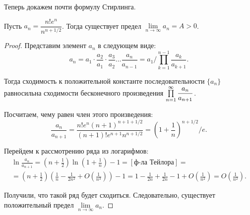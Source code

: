 Теперь докажем почти формулу Стирлинга.
\begin{Statement}
Пусть $a_n = \dfrac{n!e^n}{n^{n + 1/2}}$. Тогда существует предел $\lim\limits_{n \to \infty}a_n = A > 0$.
\end{Statement}
\begin{proof}
Представим элемент $a_n$ в следующем виде:
$$
a_n = a_1 \cdot \frac{a_2}{a_1}\cdot\frac{a_3}{a_2} \ldots \frac{a_n}{a_{n-1}} = a_1 / \prod\limits_{k=1}^{n-1} \frac{a_k}{a_{k+1}}.
$$

Тогда сходимость к положительной константе последовательности $\{a_n\}$ равносильна сходимости бесконечного произведения $\prod\limits_{n=1}^{\infty} \dfrac{a_n}{a_{n+1}}$.

Посчитаем, чему равен член этого произведения:
$$
\frac{a_n}{a_{n+1}} = \frac{n!e^n (n+1)^{n+1+1/2}}{(n+1)! e^{n+1}n^{n+1/2} } = \left(1 + \frac{1}{n} \right)^{n + 1/2} / e.
$$

Перейдем к рассмотрению ряда из логарифмов:
\begin{gather*}
\ln \frac{a_n}{a_{n+1}} = \left( n + \frac{1}{2}\right)\ln\left( 1 + \frac{1}{n}\right) - 1 = [\text{ф-ла Тейлора}] = \\ =\left(n + \frac{1}{2}\right)\left( \frac{1}{n} - \frac{1}{2n^2} + O\left(\frac{1}{n^3} \right) \right) - 1 = 1 - \frac{1}{2n} + \frac{1}{2n} - 1 + O\left(\frac{1}{n^2} \right) = O\left(\frac{1}{n^2} \right).
\end{gather*}


Получили, что такой ряд будет сходиться. Следовательно, существует положительный предел $\lim\limits_{n \to \infty}a_n$.

\end{proof}
